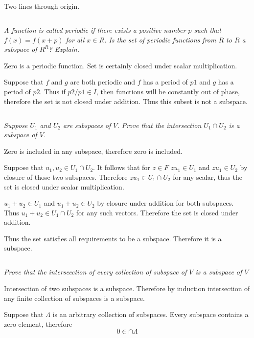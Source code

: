 \documentclass[11pt,oneside,titlepage]{book}
\begin{document}
Two lines through origin.

\subsection{}
\textit{A function is called periodic if there exists a positive number
  $p$ such that $f(x) = f(x + p)$ for all $x \in R$. Is the set of
  periodic functions from $R$ to $R$ a subspace of $R^R$? Explain. }

Zero is a periodic function. Set is
certainly closed under scalar multiplication.

Suppose that $f$ and $g$ are both periodic and $f$ has a period of $p1$
and $g$ has a period of $p2$. Thus if $p2/p1 \in I$,
then functions will be constantly out of phase, therefore the set is not
closed under addition. Thus this subset is not a subspace.

\subsection{}
\textit{Suppose $U_1$ and $U_2$ are subspaces of $V$. Prove that the
  intersection $U_1 \cap U_2$ is a subspace of $V$.}

Zero is included in any subspace, therefore zero is included.

Suppose that $u_1, u_2 \in U_1 \cap U_2$. It follows that for $z \in F$
$zu_1 \in U_1$ and $zu_1 \in U_2$ by closure of those two subspaces.
Therefore $zu_1 \in U_1 \cap U_2$ for any scalar, thus the set is
closed under scalar multiplication.

$u_1 + u_2 \in U_1$ and $u_1 + u_2 \in U_2$ by closure under addition for
both subspaces. Thus $u_1 + u_2 \in U_1 \cap U_2$ for any such vectors.
Therefore the set is closed under addition.

Thus the set satisfies all requirements to be a subspace. Therefore it is a
subspace.

\subsection{}
\textit{Prove that the interseection of every collection of subspace of $V$ is
  a subspace of $V$}

Intersection of two subspaces  is a subspace. Therefore by induction
intersection of any finite collection of subspaces is a subspace.

Suppose that $\Lambda$ is an arbitrary collection of subspaces.
Every subspace contains a zero element, therefore
$$0 \in \cap \Lambda$$
\end{document}

